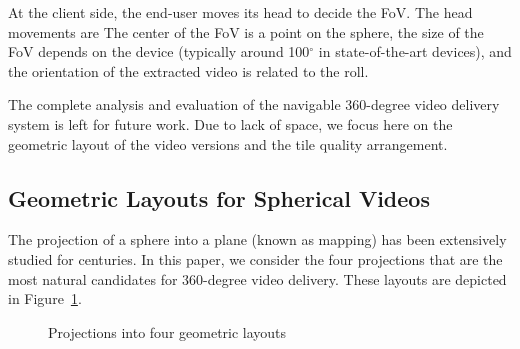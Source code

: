 At the client side, the end-user moves its head to decide the \ac{FoV}. The head movements
are  
 The center of the \ac{FoV} is a
point on the sphere, the size of the \ac{FoV} depends on the device (typically
around 100$^\circ$ in state-of-the-art devices), and the orientation of the extracted video
is related to the roll.

The complete analysis and evaluation of the navigable 360-degree video delivery system
is left for future work. Due to lack of space, we focus here on the geometric layout
of the video versions and the tile quality arrangement.


\subsection{Geometric Layouts for Spherical Videos}

The projection of a sphere into a plane (known as mapping) has been extensively studied
for centuries. In this paper, we consider the four projections that are the most natural
candidates for 360-degree video delivery. These layouts are depicted in Figure~\ref{fig:mapping}.

\begin{figure}[ht]
\centering
{}
\caption{Projections into four geometric layouts}\label{fig:mapping}
\end{figure}


